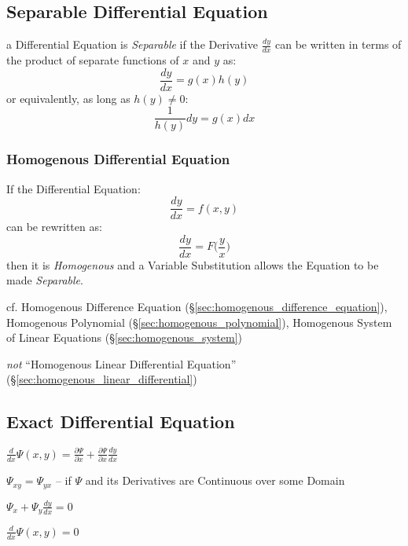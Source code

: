 \subsection{Separable Differential Equation}\label{sec:separable}

a Differential Equation is \emph{Separable} if the Derivative $\frac{dy}{dx}$
can be written in terms of the product of separate functions of $x$ and $y$ as:
\[
  \frac{dy}{dx} = g(x)h(y)
\]
or equivalently, as long as $h(y) \neq 0$:
\[
  \frac{1}{h(y)} dy = g(x) dx
\]



\subsubsection{Homogenous Differential Equation}
\label{sec:homogenous_differential_equation}

If the Differential Equation:
\[
  \frac{dy}{dx} = f(x,y)
\]
can be rewritten as:
\[
  \frac{dy}{dx} = F\Big(\frac{y}{x}\Big)
\]
then it is \emph{Homogenous} and a Variable Substitution allows the Equation to
be made \emph{Separable}.

cf. Homogenous Difference Equation
(\S\ref{sec:homogenous_difference_equation}), Homogenous Polynomial
(\S\ref{sec:homogenous_polynomial}), Homogenous System of Linear Equations
(\S\ref{sec:homogenous_system})

\emph{not} ``Homogenous Linear Differential Equation''
(\S\ref{sec:homogenous_linear_differential})



\subsection{Exact Differential Equation}\label{sec:exact_equation}

$\frac{d}{dx}\Psi(x,y) = \frac{\partial{\Psi}}{\partial{x}}
  + \frac{\partial{\Psi}}{\partial{x}}\frac{dy}{dx}$

$\Psi_{xy} = \Psi_{yx}$ -- if $\Psi$ and its Derivatives are Continuous over
some Domain

$\Psi_x + \Psi_y \frac{dy}{dx} = 0$

$\frac{d}{dx}\Psi(x,y) = 0$

